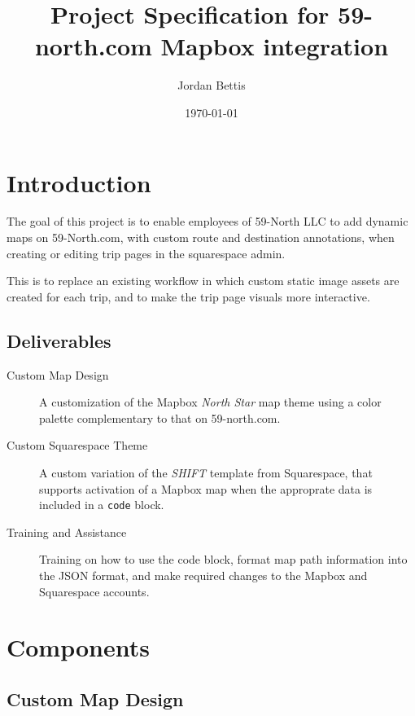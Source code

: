 \documentclass[11pt]{article}
\title{Project Specification for 59-north.com Mapbox integration}
\author{Jordan Bettis}
\date{\today{}}
\begin{document}
\maketitle
\tableofcontents

\newpage

\def\theclientprinciple{Andy Schell}
\def\theclient{59-North LLC}
\def\theclientaddress{1169 Hilltop Rd.\\Leesport, PA 19533}

\section{Introduction}

The goal of this project is to enable employees of \theclient{} to add
dynamic maps on 59-North.com, with custom route and destination
annotations, when creating or editing trip pages in the squarespace
admin.

This is to replace an existing workflow in which custom static image
assets are created for each trip, and to make the trip page visuals
more interactive.

\subsection{Deliverables}

\begin{description}

\item[Custom Map Design] A customization of the Mapbox \emph{North
  Star} map theme using a color palette complementary to that on 59-north.com.

\item[Custom Squarespace Theme] A custom variation of the \emph{SHIFT}
  template from Squarespace, that supports activation of a Mapbox map
  when the approprate data is included in a \texttt{code} block.

\item[Training and Assistance] Training on how to use the code block,
  format map path information into the JSON format, and make required
  changes to the Mapbox and Squarespace accounts.


\end{description}

\section{Components}

\subsection{Custom Map Design}
\end{document}
